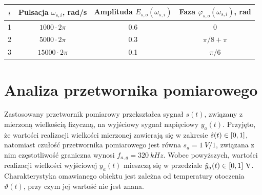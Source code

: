 \begin{table}[htb!]
\begin{tabular}[c]{| c | c | c | c |} \hline
\textbf{$i$} & \textbf{Pulsacja $\omega_{s,i}$, rad/s} & \textbf{Amplituda $E_{s,o}(\omega_{s,i})$} & \textbf{Faza $\varphi_{s,o}(\omega_{s,i})$, rad} \\ \hline
1 & $1000  \cdot 2\pi$ &  \num{0.6} & $0$           \\ \hline
2 & $5000  \cdot 2\pi$ &  \num{0.3} & $\pi/8 + \pi$ \\ \hline
3 & $15000 \cdot 2\pi$ &  \num{0.1} & $\pi/6$       \\ \hline
\end{tabular}
\end{table}

\section{Analiza przetwornika pomiarowego}

Zastosowany przetwornik pomiarowy przekształca sygnał $s(t)$, związany z mierzoną wielkością fizyczną, na wyjściowy sygnał napięciowy $y_{a}(t)$. Przyjęto, że wartości realizacji wielkości mierzonej zawierają się w zakresie $\hat{s}(t) \in \interval{0}{1}$, natomiast czułość przetwornika pomiarowego jest równa $s_{a} = \qty{1}{V \per 1}$, związana z nim częstotliwość graniczna wynosi $f_{a,g} = \qty{320}{kHz}$. Wobec powyższych, wartości realizacji wielkości wyjściowej $y_{a}(t)$ mieszczą się w przedziale $\hat{y}_{a}(t) \in \interval{0}{1}~\unit{V}$. Charakterystyka omawianego obiektu jest zależna od temperatury otoczenia $\vartheta(t)$, przy czym jej wartość nie jest znana.

